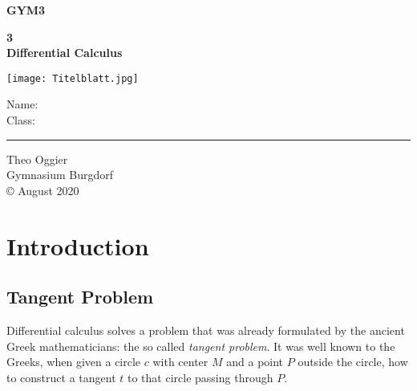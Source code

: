 \documentclass[12pt,eng]{skript_ogg}
\begin{document}
\thispagestyle{plain}
\begin{titlepage}

\begin{center}

\vspace*{0cm} {\setlength{\baselineskip}{8ex}

{\Huge\textbf{GYM3}\\[2.5cm]}

{\Large\textbf{3\\Differential Calculus}}}

\vspace{5mm}

\texttt{[image: Titelblatt.jpg]}
\end{center}

\vfill

{\large Name:\\
Class:}\\
\rule{\textwidth}{0.5pt}

\begin{flushright}
Theo Oggier\\
Gymnasium Burgdorf\\
\vspace{5mm} \copyright\,\,August 2020
\end{flushright}

\end{titlepage}

\tableofcontents        %
\newpage

\clearpage

\section{Introduction}
\subsection{Tangent Problem}
Differential calculus solves a problem that was already formulated by the ancient Greek mathematicians: the so called \emph{tangent problem}. It was well known to the Greeks, when given a circle $c$ with center $M$ and a point $P$ outside the circle, how to construct a tangent $t$ to that circle passing through $P$.

\vspace{-3mm}
\end{document}
